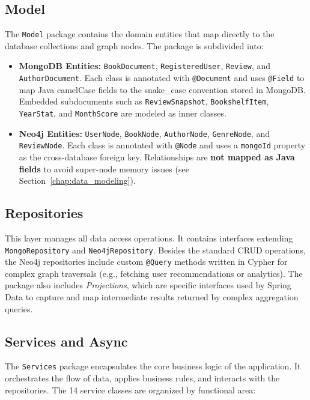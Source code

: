 \subsection{Model}
The \texttt{Model} package contains the domain entities that map directly to the database collections and graph nodes. The package is subdivided into:
\begin{itemize}
    \item \textbf{MongoDB Entities:} \texttt{BookDocument}, \texttt{RegisteredUser}, \texttt{Review}, and \texttt{AuthorDocument}. Each class is annotated with \texttt{@Document} and uses \texttt{@Field} to map Java camelCase fields to the snake\_case convention stored in MongoDB. Embedded subdocuments such as \texttt{ReviewSnapshot}, \texttt{BookshelfItem}, \texttt{YearStat}, and \texttt{MonthScore} are modeled as inner classes.
    \item \textbf{Neo4j Entities:} \texttt{UserNode}, \texttt{BookNode}, \texttt{AuthorNode}, \texttt{GenreNode}, and \texttt{ReviewNode}. Each class is annotated with \texttt{@Node} and uses a \texttt{mongoId} property as the cross-database foreign key. Relationships are \textbf{not mapped as Java fields} to avoid super-node memory issues (see Section~\ref{chap:data_modeling}).
\end{itemize}

\subsection{Repositories}
This layer manages all data access operations. It contains interfaces extending \texttt{MongoRepository} and \texttt{Neo4jRepository}. Besides the standard CRUD operations, the Neo4j repositories include custom \texttt{@Query} methods written in Cypher for complex graph traversals (e.g., fetching user recommendations or analytics). The package also includes \textit{Projections}, which are specific interfaces used by Spring Data to capture and map intermediate results returned by complex aggregation queries.

\subsection{Services and Async}
The \texttt{Services} package encapsulates the core business logic of the application. It orchestrates the flow of data, applies business rules, and interacts with the repositories. The 14 service classes are organized by functional area:

